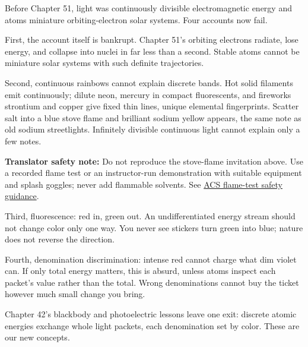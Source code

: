 \begin{mainline}
Before Chapter 51, light was continuously divisible electromagnetic energy and atoms miniature orbiting-electron solar systems. Four accounts now fail.

First, the account itself is bankrupt. Chapter 51's orbiting electrons radiate, lose energy, and collapse into nuclei in far less than a second. Stable atoms cannot be miniature solar systems with such definite trajectories.

Second, continuous rainbows cannot explain discrete bands. Hot solid filaments emit continuously; dilute neon, mercury in compact fluorescents, and fireworks strontium and copper give fixed thin lines, unique elemental fingerprints. Scatter salt into a blue stove flame and brilliant sodium yellow appears, the same note as old sodium streetlights. Infinitely divisible continuous light cannot explain only a few notes.

\textbf{Translator safety note:} Do not reproduce the stove-flame invitation above. Use a recorded flame test or an instructor-run demonstration with suitable equipment and splash goggles; never add flammable solvents. See \href{https://institute.acs.org/acs-center/lab-safety/education-training/safer-experiments/flame-test.html}{ACS flame-test safety guidance}.

Third, fluorescence: red in, green out. An undifferentiated energy stream should not change color only one way. You never see stickers turn green into blue; nature does not reverse the direction.

Fourth, denomination discrimination: intense red cannot charge what dim violet can. If only total energy matters, this is absurd, unless atoms inspect each packet's value rather than the total. Wrong denominations cannot buy the ticket however much small change you bring.

Chapter 42's blackbody and photoelectric lessons leave one exit: discrete atomic energies exchange whole light packets, each denomination set by color. These are our new concepts.
\end{mainline}


